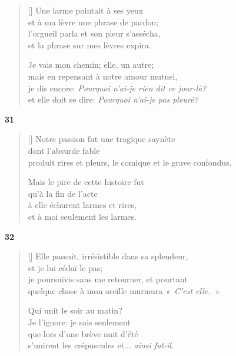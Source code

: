 \documentclass[a4paper,12pt]{book}
\begin{document}

\begin{verse}[\versewidth]
  Une larme pointait à ses yeux \\
  et à ma lèvre une phrase de pardon; \\
  l'orgueil parla et son pleur s'assécha, \\
  et la phrase sur mes lèvres expira.

  Je vais mon chemin; elle, un autre; \\
  mais en repensant à notre amour mutuel, \\
  je dis encore: \emph{Pourquoi n'ai-je rien dit ce jour-là?} \\
  et elle doit se dire: \emph{Pourquoi n'ai-je pas pleuré?}
\end{verse}

\bigskip

\begin{center}
  \textbf{31}
\end{center}

\settowidth{\versewidth}{Notre passion fut une tragique saynète}

\begin{verse}[\versewidth]
  Notre passion fut une tragique saynète \\
  dont l'absurde fable \\
  produit rires et pleurs,
  le comique et le grave confondus.

  Mais le pire de cette histoire fut \\
  qu'à la fin de l'acte \\
  à elle échurent larmes et rires, \\
  et à moi seulement les larmes.
\end{verse}

\bigskip

\begin{center}
  \textbf{32}
\end{center}

\settowidth{\versewidth}{je poursuivis sans me retourner, et pourtant}

\begin{verse}[\versewidth]
  Elle passait, irrésistible dans sa splendeur, \\
  et je lui cédai le pas; \\
  je poursuivis sans me retourner, et pourtant \\
  quelque chose à mon oreille murmura \emph{«~C'est elle.~»}

  Qui unit le soir au matin? \\
  Je l'ignore: je sais seulement \\
  que lors d'une brève nuit d'été \\
  s'unirent les crépuscules et... \emph{ainsi fut-il}.
\end{verse}
\end{document}
